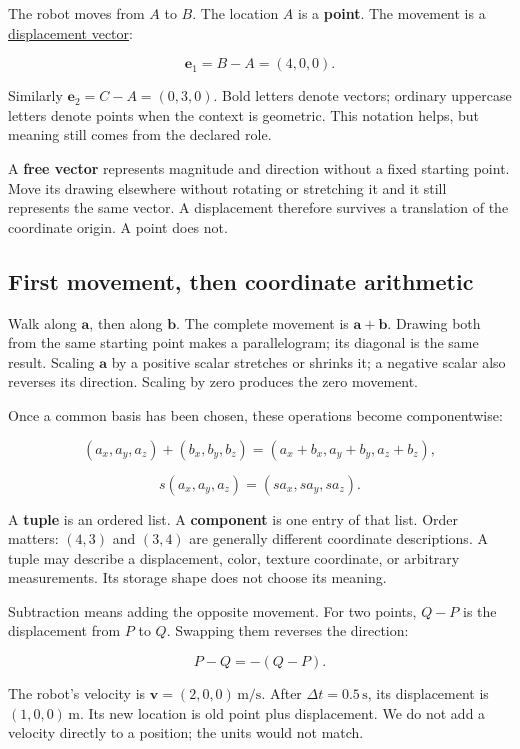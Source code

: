The robot moves from \(A\) to \(B\). The location \(A\) is a \textbf{point}. The movement is a \hyperref[01-foundations-i-ch017-an-arrow-is-not-the-address-written-beside-it]{displacement vector}:

\[
\mathbf e_1=B-A=(4,0,0).
\]

Similarly \(\mathbf e_2=C-A=(0,3,0)\). Bold letters denote vectors; ordinary uppercase letters denote points when the context is geometric. This notation helps, but meaning still comes from the declared role.

A \textbf{free vector} represents magnitude and direction without a fixed starting point. Move its drawing elsewhere without rotating or stretching it and it still represents the same vector. A displacement therefore survives a translation of the coordinate origin. A point does not.

\subsection{First movement, then coordinate arithmetic}\label{01-foundations-i-ch017-first-movement-then-coordinate-arithmetic}

Walk along \(\mathbf a\), then along \(\mathbf b\). The complete movement is \(\mathbf a+\mathbf b\). Drawing both from the same starting point makes a parallelogram; its diagonal is the same result. Scaling \(\mathbf a\) by a positive scalar stretches or shrinks it; a negative scalar also reverses its direction. Scaling by zero produces the zero movement.

Once a common basis has been chosen, these operations become componentwise:

\[
(a_x,a_y,a_z)+(b_x,b_y,b_z)
=(a_x+b_x,a_y+b_y,a_z+b_z),
\]

\[
s(a_x,a_y,a_z)=(sa_x,sa_y,sa_z).
\]

A \textbf{tuple} is an ordered list. A \textbf{component} is one entry of that list. Order matters: \((4,3)\) and \((3,4)\) are generally different coordinate descriptions. A tuple may describe a displacement, color, texture coordinate, or arbitrary measurements. Its storage shape does not choose its meaning.

Subtraction means adding the opposite movement. For two points, \(Q-P\) is the displacement from \(P\) to \(Q\). Swapping them reverses the direction:

\[
P-Q=-(Q-P).
\]

The robot's velocity is \(\mathbf v=(2,0,0)\,\mathrm{m/s}\). After \(\Delta t=0.5\,\mathrm s\), its displacement is \((1,0,0)\,\mathrm m\). Its new location is old point plus displacement. We do not add a velocity directly to a position; the units would not match.

